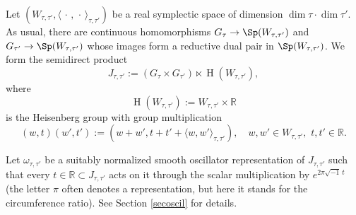 \documentclass[12pt,a4paper]{amsart}
\newcommand{\oH}{\operatorname{H}}
\newcommand{\R}{\mathbb R}
\newcommand{\la}{\langle}
\newcommand{\ra}{\rangle}
\numberwithin{equation}{section}
\theoremstyle{remark}
\begin{document}
   Let $(W_{\tau, \tau'}, \la \,\cdot\,,\,\cdot\,\ra_{\tau, \tau'})$ be a real symplectic space of  dimension $\dim \tau\cdot \dim \tau'$. As usual, there are continuous homomorphisms $G_\tau\rightarrow \Sp(W_{\tau, \tau'})$ and $G_{\tau'}\rightarrow \Sp(W_{\tau, \tau'})$ whose images form a reductive dual pair in $\Sp(W_{\tau, \tau'})$. We form the semidirect product
   \[
   J_{\tau, \tau'}:=(G_\tau\times G_{\tau'})\ltimes \oH(W_{\tau, \tau'}),
   \]
   where
  \[
  \oH(W_{\tau, \tau'}):=W_{\tau, \tau'}\times \R
  \]
  is the Heisenberg group with group multiplication
  \[
  (w,t)(w',t'):=(w+w', t+t'+\la w,w'\ra_{\tau, \tau'}), \quad
  w,w'\in W_{\tau, \tau'},\,\,t,t'\in \R.
 \]

 Let $\omega_{\tau, \tau'}$ be a suitably normalized smooth oscillator representation of $J_{\tau, \tau'}$ such that every $t\in \R\subset J_{\tau, \tau'}$ acts on it through the scalar multiplication by $e^{2\pi \sqrt{-1}\, t}$ (the letter $\pi$  often denotes a representation, but here it stands for the circumference ratio).  See Section \ref{secoscil} for details.
\end{document}
